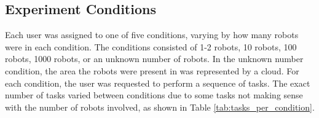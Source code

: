 \subsection{Experiment Conditions} \label{section:Experiment_Conditions}

Each user was assigned to one of five conditions, varying by how many robots were in each condition. 
The conditions consisted of 1-2 robots, 10 robots, 100 robots, 1000 robots, or an unknown number of robots.
In the unknown number condition, the area the robots were present in was represented by a cloud. 
For each condition, the user was requested to perform a sequence of tasks. 
The exact number of tasks varied between conditions due to some tasks not making sense with the number of robots involved, as shown in Table \ref{tab:tasks_per_condition}. 

